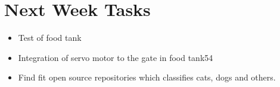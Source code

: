 \section{Next Week Tasks}
\label{sec:nextWeekTasks}
\begin{itemize}
    \item Test of food tank
    \item Integration of servo motor to the gate in food tank54
    \item Find fit open source repositories which classifies cats, dogs and others.
\end{itemize}
